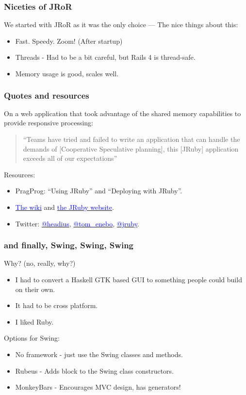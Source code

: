 \begin{frame}\frametitle{Niceties of JRoR}
  We started with JRoR as it was the only choice --- The nice things about this:
  \begin{itemize}
    \item Fast. Speedy. Zoom! (After startup)
    \item Threads - Had to be a bit careful, but Rails 4 is thread-safe.
    \item Memory usage is good, scales well.
  \end{itemize}
\end{frame}
\begin{frame}\frametitle{Quotes and resources}
  On a web application that took advantage of the shared memory capabilities to provide responsive
  processing:
  \begin{quote}
  ``Teams have tried and failed to write an application that can handle the demands of [Cooperative
    Speculative planning], this [JRuby] application exceeds all of our expectations''
  \end{quote}
  Resources:
  \begin{itemize}
    \item PragProg: ``Using JRuby'' and ``Deploying with JRuby''.
    \item \href{https://github.com/jruby/jruby/wiki}{\textcolor{blue}{The wiki}} and
      \href{http://jruby.org}{\textcolor{blue}{the JRuby website}}.
    \item Twitter: \href{https://twitter.com/headius}{\textcolor{blue}{@headius}},
      \href{https://twitter.com/tom\_enebo}{\textcolor{blue}{@tom\_enebo}},
      \href{https://twitter.com/jruby}{\textcolor{blue}{@jruby}}.
  \end{itemize}
\end{frame}
\begin{frame}\frametitle{and finally, Swing, Swing, Swing}
  Why? (no, really, why?)
  \begin{itemize}
    \item I had to convert a Haskell GTK based GUI to something people could build on their own.
    \item It had to be cross platform.
    \item I liked Ruby.
  \end{itemize}
  Options for Swing:
  \begin{itemize}
    \item No framework - just use the Swing classes and methods.
    \item Rubeus - Adds block to the Swing class constructors.
    \item MonkeyBars - Encourages MVC design, has generators!
  \end{itemize}
\end{frame}
